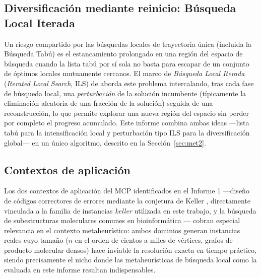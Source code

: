 \subsection{Diversificación mediante reinicio: Búsqueda Local Iterada}

Un riesgo compartido por las búsquedas locales de trayectoria única (incluida la Búsqueda Tabú) es el estancamiento prolongado en una región del espacio de búsqueda cuando la lista tabú por sí sola no basta para escapar de un conjunto de óptimos locales mutuamente cercanos. El marco de \emph{Búsqueda Local Iterada} (\textit{Iterated Local Search}, ILS) de \textcite{lourenco2003ils} aborda este problema intercalando, tras cada fase de búsqueda local, una \emph{perturbación} de la solución incumbente (t\'ipicamente la eliminación aleatoria de una fracción de la solución) seguida de una reconstrucción, lo que permite explorar una nueva región del espacio sin perder por completo el progreso acumulado. Este informe combina ambas ideas —lista tabú para la intensificación local y perturbación tipo ILS para la diversificación global— en un único algoritmo, descrito en la Sección~\ref{sec:met2}.

\subsection{Contextos de aplicación}

Los dos contextos de aplicación del MCP identificados en el Informe 1 —diseño de códigos correctores de errores mediante la conjetura de Keller \parencite{lagarias1992keller}, directamente vinculada a la familia de instancias \textit{keller} utilizada en este trabajo, y la búsqueda de subestructuras moleculares comunes en bioinformática \parencite{gardiner1997clique}— cobran especial relevancia en el contexto metaheurístico: ambos dominios generan instancias reales cuyo tamaño ($n$ en el orden de cientos a miles de vértices, grafos de producto molecular densos) hace inviable la resolución exacta en tiempo práctico, siendo precisamente el nicho donde las metaheurísticas de búsqueda local como la evaluada en este informe resultan indispensables.

